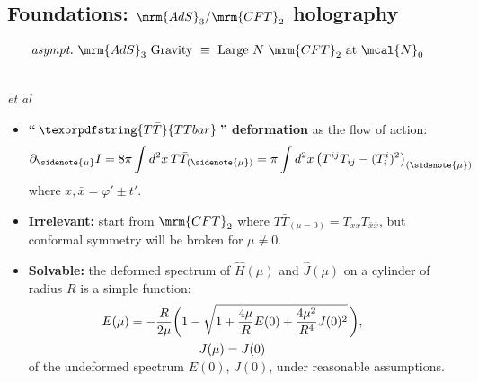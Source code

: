 \documentclass[10pt]{article}
\newcommand{\citations}[1]{{\footnotesize#1\par}}
\newcommand{\TTbar}{\texorpdfstring{\ensuremath{T\bar{T}}}{TTbar}\xspace}
\begin{document}
\begin{multicols}{3}
\subsection*{Foundations: $\mrm{AdS}_3/\mrm{CFT}_2$ holography}
\vspace{-.5\baselineskip}
{\large \begin{align*}
	\textrm{\textit{asympt.}~$\mrm{AdS}_3$ Gravity}
	&\ \equiv\ 
	\textrm{Large $N$ $\mrm{CFT}_2$ at $\mcal{N}_0$}
\end{align*}}

\citations{\noindent%
	\textcite{Maldacena:1997re}\\
	\textcite{Aharony:1999ti} \textit{et al}
}


%
%	


\begin{itemize}

\item \textbf{``\,$\TTbar$\,'' deformation} as the flow of action:
\begin{equation}
	\partial_{\sidenote{\mu}} I = {8 \pi} \int d^2x \, T\bar T_{(\sidenote{\mu})} = {\pi} \int d^2x\,\big( T^{ij}T_{ij}- (T^i_i)^2 \big)_{(\sidenote{\mu})}
	\label{TTbardef}
\end{equation}
where $x, \bar{x} = \varphi' \pm t'$.

\item \textbf{Irrelevant:} start from $\mrm{CFT}_2$ where $T\bar{T}_{(\mu = 0)} = T_{xx} T_{\bar{x}\bar{x}}$, but conformal symmetry will be broken for $\mu \ne 0$.

\item \textbf{Solvable:} the deformed spectrum of $\hat{H}(\mu)$ and $\hat{J}(\mu)$ on a cylinder of radius $R$ is a simple function:
\begin{equation}
\hspace{-2em}
\begin{gathered}
	E(\mu) = - \frac{R }{ 2\mu } \bigg(1-\sqrt{1 + \frac{4\mu}{R} E(0) + \frac{4\mu^2}{R^4} J(0)^2 }
	\,\bigg), \\ J(\mu)=J(0) \\[-1.5ex]
\end{gathered} \label{ttbarspectrum}
\end{equation}
of the undeformed spectrum $E(0)$, $J(0)$,
under reasonable assumptions. 


\end{itemize}
\end{multicols}
\end{document}
